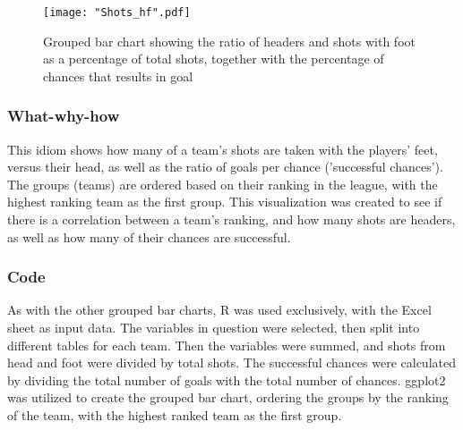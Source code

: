 \documentclass[Report.tex]{subfiles}
\begin{document}
\begin{figure}
\center
\texttt{[image: "Shots\_hf".pdf]}
\caption{Grouped bar chart showing the ratio of headers and shots with foot as
a percentage of total shots, together with the percentage of chances that
results in goal}
\label{Fig:Shots_HF} 
\end{figure}

\subsubsection{What-why-how}
This idiom shows how many of a team's shots are taken with the players' feet,
versus their head, as well as the ratio of goals per chance ('successful
chances'). The groups (teams) are ordered based on their ranking in the league,
with the highest ranking team as the first group. 
This visualization was created to see if
there is a correlation between a team's ranking, and how many shots are headers,
as well as how many of their chances are successful.

\subsubsection{Code}
As with the other grouped bar charts, R was used exclusively, with the Excel
sheet as input data. 
The variables in question were selected, then split into different tables for
each team. Then the variables were summed, and shots from head and foot were
divided by total shots. The successful chances were calculated by dividing the
total number of goals with the total number of chances. 
ggplot2 was utilized to create the grouped bar chart, ordering the groups by the
ranking of the team, with the highest ranked team as the first group.
\end{document}
